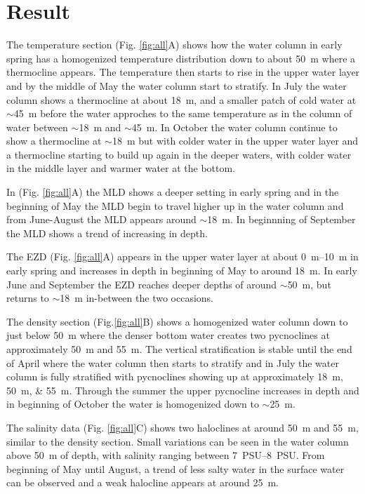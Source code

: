 \documentclass[../Main.tex]{subfiles}
\begin{document}
\section*{\crule[blue]{.3cm}{.3cm} Result}
The temperature section (Fig. \ref{fig:all}A) shows how the water column in early spring has a homogenized temperature distribution down to about \SI{50}{\metre} where a thermocline appears. The temperature then starts to rise in the upper water layer and by the middle of May the water column start to stratify. In July the water column shows a thermocline at about \SI{18}{m}, and a smaller patch of cold water at $\sim$\SI{45}{\metre} before the water approches to the same temperature as in the column of water between $\sim$\SI{18}{\metre} and $\sim$\SI{45}{\metre}. 
In October the water column continue to show a thermocline at $\sim$\SI{18}{\metre} but with colder water in the upper water layer and a thermocline starting to build up again in the deeper waters, with colder water in the middle layer and warmer water at the bottom. 

In (Fig. \ref{fig:all}A) the MLD shows a deeper setting in early spring and in the beginning of May the MLD begin to travel higher up in the water column and from June-August the MLD appears around $\sim$\SI{18}{\metre}. In beginnning of September the MLD shows a trend of increasing in depth. 

The EZD (Fig. \ref{fig:all}A) appears in the upper water layer at about \SIrange{0}{10}{m} in early spring and increases in depth in beginning of May to around \SI{18}{m}. In early June and September the EZD reaches deeper depths of around $\sim$\SI{50}{\metre}, but returns to $\sim$\SI{18}{\metre} in-between the two occasions.

The density section (Fig.\ref{fig:all}B) shows a homogenized water column down to just below \SI{50}{m} where the denser bottom water creates two pycnoclines at approximately \SI{50}{m} and \SI{55}{m}. The vertical stratification is stable until the end of April where the water column then starts to stratify and in July the water column is fully stratified with pycnoclines showing up at approximately \SIlist{18;50;55}{\metre}. 
Through the summer the upper pycnocline increases in depth and in beginning of October the water is homogenized down to $\sim$\SI{25}{\metre}.

The salinity data (Fig. \ref{fig:all}C) shows two haloclines at around \SI{50}{m} and \SI{55}{m}, similar to the density section. Small variations can be seen in the water column above \SI{50}{m} of depth, with salinity ranging between \SIrange{7}{8}{PSU}. From beginning of May until August, a trend of less salty water in the surface water can be observed and a weak halocline appears at around \SI{25}{m}.
\end{document}
